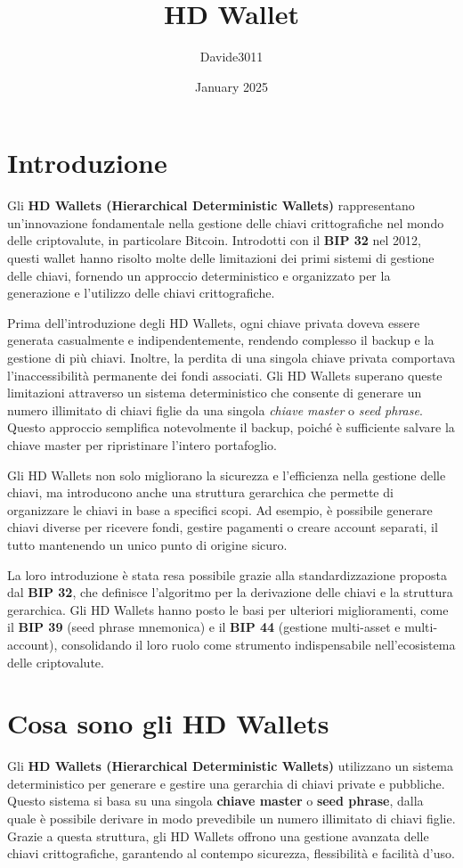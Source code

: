 \documentclass{article}
\title{HD Wallet}
\author{Davide3011}
\date{January 2025}
\begin{document}
\maketitle

\section{Introduzione}
Gli \textbf{HD Wallets (Hierarchical Deterministic Wallets)} rappresentano un'innovazione fondamentale nella gestione delle chiavi crittografiche nel mondo delle criptovalute, in particolare Bitcoin. Introdotti con il \textbf{BIP 32} nel 2012, questi wallet hanno risolto molte delle limitazioni dei primi sistemi di gestione delle chiavi, fornendo un approccio deterministico e organizzato per la generazione e l'utilizzo delle chiavi crittografiche.

Prima dell'introduzione degli HD Wallets, ogni chiave privata doveva essere generata casualmente e indipendentemente, rendendo complesso il backup e la gestione di più chiavi. Inoltre, la perdita di una singola chiave privata comportava l'inaccessibilità permanente dei fondi associati. Gli HD Wallets superano queste limitazioni attraverso un sistema deterministico che consente di generare un numero illimitato di chiavi figlie da una singola \textit{chiave master} o \textit{seed phrase}. Questo approccio semplifica notevolmente il backup, poiché è sufficiente salvare la chiave master per ripristinare l'intero portafoglio.

Gli HD Wallets non solo migliorano la sicurezza e l'efficienza nella gestione delle chiavi, ma introducono anche una struttura gerarchica che permette di organizzare le chiavi in base a specifici scopi. Ad esempio, è possibile generare chiavi diverse per ricevere fondi, gestire pagamenti o creare account separati, il tutto mantenendo un unico punto di origine sicuro.

La loro introduzione è stata resa possibile grazie alla standardizzazione proposta dal \textbf{BIP 32}, che definisce l'algoritmo per la derivazione delle chiavi e la struttura gerarchica. Gli HD Wallets hanno posto le basi per ulteriori miglioramenti, come il \textbf{BIP 39} (seed phrase mnemonica) e il \textbf{BIP 44} (gestione multi-asset e multi-account), consolidando il loro ruolo come strumento indispensabile nell'ecosistema delle criptovalute.

\section{Cosa sono gli HD Wallets}
Gli \textbf{HD Wallets (Hierarchical Deterministic Wallets)} utilizzano un sistema deterministico per generare e gestire una gerarchia di chiavi private e pubbliche. Questo sistema si basa su una singola \textbf{chiave master} o \textbf{seed phrase}, dalla quale è possibile derivare in modo prevedibile un numero illimitato di chiavi figlie. Grazie a questa struttura, gli HD Wallets offrono una gestione avanzata delle chiavi crittografiche, garantendo al contempo sicurezza, flessibilità e facilità d'uso.
\end{document}
